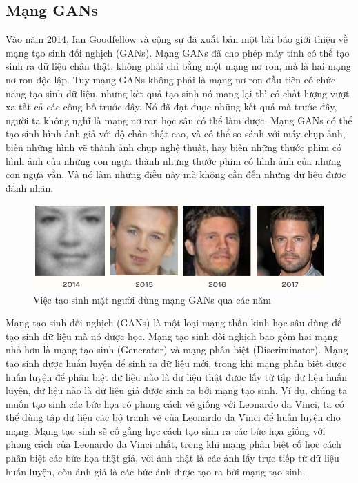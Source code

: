 \subsection{Mạng GANs}\label{sec:base_knowledge_gans}
Vào năm 2014, Ian Goodfellow và cộng sự đã xuất bản một bài báo \cite{gans_base} giới thiệu về mạng tạo sinh đối nghịch (GANs). Mạng GANs đã cho phép máy tính có thể tạo sinh ra dữ liệu chân thật, không phải chỉ bằng một mạng nơ ron, mà là hai mạng nơ ron độc lập. Tuy mạng GANs không phải là mạng nơ ron đầu tiên có chức năng tạo sinh dữ liệu, nhưng kết quả tạo sinh nó mang lại thì có chất lượng vượt xa tất cả các công bố trước đây. Nó đã đạt được những kết quả mà trước đây, người ta không nghĩ là mạng nơ ron học sâu có thể làm được. Mạng GANs có thể tạo sinh hình ảnh giả với độ chân thật cao, và có thể so sánh với máy chụp ảnh, biến những hình vẽ thành ảnh chụp nghệ thuật, hay biến những thước phim có hình ảnh của những con ngựa thành những thước phim có hình ảnh của những con ngựa vằn. Và nó làm những điều này mà không cần đến những dữ liệu được đánh nhãn.

\begin{figure}[H]
    \centering
    \includegraphics[width=15cm]{./content/materials/gans-faces.png}
    \caption{Việc tạo sinh mặt người dùng mạng GANs qua các năm \cite{gans_faces}}
\end{figure}

Mạng tạo sinh đối nghịch (GANs) là một loại mạng thần kinh học sâu dùng để tạo sinh dữ liệu mà nó được học. Mạng tạo sinh đối nghịch bao gồm hai mạng nhỏ hơn là mạng tạo sinh (Generator) và mạng phân biệt (Discriminator). Mạng tạo sinh được huấn luyện để sinh ra dữ liệu mới, trong khi mạng phân biệt được huấn luyện để phân biệt dữ liệu nào là dữ liệu thật được lấy từ tập dữ liệu huấn luyện, dữ liệu nào là dữ liệu giả được sinh ra bởi mạng tạo sinh. Ví dụ, chúng ta muốn tạo sinh các bức họa có phong cách vẽ giống với Leonardo da Vinci, ta có thể dùng tập dữ liệu các bộ tranh vẽ của Leonardo da Vinci để huấn luyện cho mạng. Mạng tạo sinh sẽ cố gắng học cách tạo sinh ra các bức họa giống với phong cách của Leonardo da Vinci nhất, trong khi mạng phân biệt cố  học cách phân biệt các bức họa thật giả, với ảnh thật là các ảnh lấy trực tiếp từ dữ liệu huấn luyện, còn ảnh giả là các bức ảnh được tạo ra bởi mạng tạo sinh.

